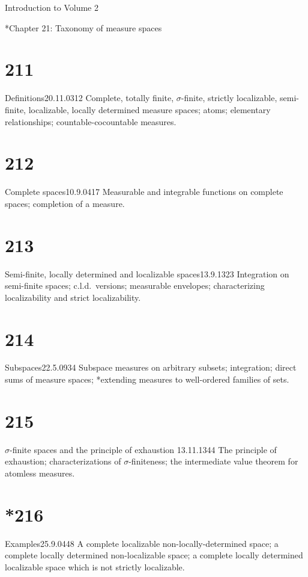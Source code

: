 
Introduction to Volume 2 


 *Chapter 21: Taxonomy of measure spaces


\section{211}{Definitions}{20.11.03}{12}{}
{Complete, totally finite, $\sigma$-finite, strictly localizable,
semi-finite, localizable, locally determined measure spaces;  atoms;
elementary relationships;  countable-cocountable measures.}

\section{212}{Complete spaces}{10.9.04}{17}{}
{Measurable and integrable functions on complete spaces;
completion of a measure.}

\section{213}{Semi-finite, locally determined and localizable
spaces}{13.9.13}{23}{}
{Integration on semi-finite spaces;  c.l.d.\ versions;  measurable
envelopes;  characterizing localizability and strict localizability.}

\section{214}{Subspaces}{22.5.09}{34}{}
{Subspace measures on arbitrary subsets;  integration;  direct
sums of measure spaces;  *extending measures to well-ordered families of
sets.}

\section{215}{$\sigma$-finite spaces and the principle of exhaustion}
{13.11.13}{44}{}
{The principle of exhaustion;  characterizations of $\sigma$-finiteness;
the intermediate value theorem for atomless measures.}

\section{*216}{Examples}{25.9.04}{48}{}
{A complete localizable non-locally-determined space;  a complete
locally determined non-localizable space;  a complete locally determined
localizable space which is not strictly localizable.}

